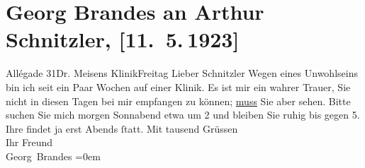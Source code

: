 

         
         \renewcommand{\erwaehntePersonen}{Personen: Valdemar Meisen}
         \renewcommand{\erwaehnteOrte}{Orte: Allégade, Kopenhagen, Meisen’s Klinik}
         \renewcommand{\erwaehnteWerke}{}
               \section[Georg Brandes an Arthur Schnitzler, {[}11. 5. 1923{]}]{ Georg Brandes an Arthur Schnitzler, {[}11. 5. 1923{]}}\nopagebreak{}\rehead{ }\begin{ledgroupsized}[t]{13cm}\normalsize\beginnumbering \toendnotes[C]{\smallbreak\pagebreak[2]} 
\toendnotes[C]{\smallbreak}\pstart
           \raggedleft{}{\pb}Allégade 31Dr. Meisens KlinikFreitag\pend
           \pstart{}Lieber Schnitzler\pend\pstart
           Wegen eines Unwohlseins bin ich seit ein Paar Wochen auf einer Klinik. Es ist mir ein wahrer Trauer, Sie
               nicht in diesen Tagen bei mir empfangen zu können; \uline{muss} Sie aber sehen.\pend
           \pstart
           Bitte suchen Sie mich morgen Sonnabend etwa um 2 und
               bleiben Sie ruhig bis gegen 5. Ihre \label{K_L02398-1v}\label{K_L02398-1h} findet ja erst Abends ſtatt.\pend
           \pstart
           Mit tausend Grüssen{\\[\baselineskip]}Ihr Freund{\\[\baselineskip]}\spacefill\mbox{Georg Brandes}\pend
           \leftskip=0em{}
         
         \endnumbering{}\end{ledgroupsized}  \newcommand{\dateiname}{L02398}\newcommand{\titel}{Georg Brandes an Arthur Schnitzler, [11. 5. 1923]}\newcommand{\editorInnen}{Martin Anton Müller und Gerd-Hermann Susen}
      